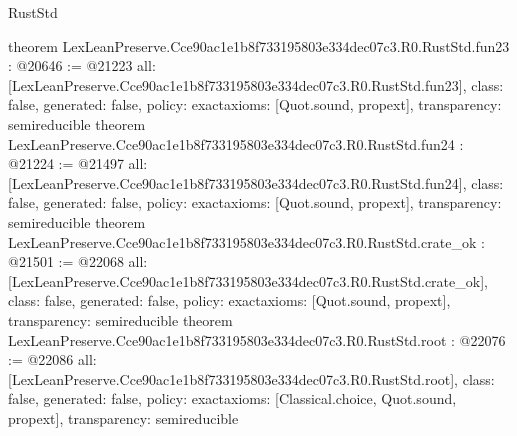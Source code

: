 \begin{lexlean}{RustStd}
\begin{coremodule}
{}
theorem LexLeanPreserve.Cce90ac1e1b8f733195803e334dec07c3.R0.RustStd.fun23 : @20646 := @21223 {
  all: [LexLeanPreserve.Cce90ac1e1b8f733195803e334dec07c3.R0.RustStd.fun23],
  class: false,
  generated: false,
  policy: exact{axioms: [Quot.sound, propext]},
  transparency: semireducible
}
theorem LexLeanPreserve.Cce90ac1e1b8f733195803e334dec07c3.R0.RustStd.fun24 : @21224 := @21497 {
  all: [LexLeanPreserve.Cce90ac1e1b8f733195803e334dec07c3.R0.RustStd.fun24],
  class: false,
  generated: false,
  policy: exact{axioms: [Quot.sound, propext]},
  transparency: semireducible
}
theorem LexLeanPreserve.Cce90ac1e1b8f733195803e334dec07c3.R0.RustStd.crate_ok : @21501 := @22068 {
  all: [LexLeanPreserve.Cce90ac1e1b8f733195803e334dec07c3.R0.RustStd.crate_ok],
  class: false,
  generated: false,
  policy: exact{axioms: [Quot.sound, propext]},
  transparency: semireducible
}
theorem LexLeanPreserve.Cce90ac1e1b8f733195803e334dec07c3.R0.RustStd.root : @22076 := @22086 {
  all: [LexLeanPreserve.Cce90ac1e1b8f733195803e334dec07c3.R0.RustStd.root],
  class: false,
  generated: false,
  policy: exact{axioms: [Classical.choice, Quot.sound, propext]},
  transparency: semireducible
}


\end{coremodule}
\end{lexlean}
